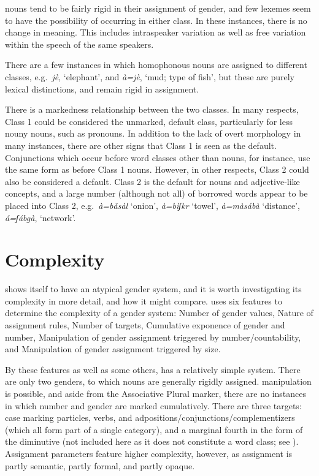 \documentclass[output=collectionpaper,hidelinks]{langscibook}
\theoremstyle{remark}
\begin{document}
 nouns tend to be fairly rigid in their assignment of gender, and few
lexemes seem to have the possibility of occurring in either class. In these
instances, there is no change in meaning. This includes intraspeaker variation
as well as free variation within the speech of the same speakers.

There are a few instances in which homophonous nouns are assigned to different
classes, e.g.\ \emph{jè}, `elephant', and \emph{à=jè}, `mud; type of fish',
but these are purely lexical distinctions, and remain rigid in assignment.

There is a markedness relationship between the two classes. In many respects,
Class 1 could be considered the unmarked, default class, particularly for less
nouny nouns, such as pronouns. In addition to the lack of overt morphology in
many instances, there are other signs that Class 1 is seen as the default.
Conjunctions which occur before word classes other than nouns, for instance, use
the same form as before Class 1 nouns.
However, in other respects, Class 2 could also be considered a default.  Class 2
is the default for nouns and adjective-like concepts, and a large number
(although not all) of borrowed words appear to be placed into Class 2, e.g.\
\emph{à=bǎsàl} `onion', \emph{à=bìʃk\iLowMid{}\hspace*{-0.6mm}r} `towel',
\emph{à=màsábà} `distance', \emph{á=ʃáb\aLowMid{}\hspace*{-.4mm}gà},
`network'.

\section{Complexity}
\label{sec:Complexity}

 shows itself to have an atypical gender system, and it is worth
investigating its complexity in more detail, and how it might compare.
\citet[183]{DiGarbo2014} uses six features to determine the
complexity of a gender system: Number of gender values, Nature of assignment
rules, Number of targets, Cumulative exponence of gender and number,
Manipulation of gender assignment triggered by number/countability, and
Manipulation of gender assignment triggered by size.

By these features as well as some others,  has a relatively
simple system. There are only two genders, to which nouns are generally rigidly
assigned. \ili{No} manipulation is possible, and aside from the Associative Plural
marker, there are no instances in which number and gender are marked
cumulatively. There are three targets: case marking particles, verbs, and
adpositions\slash conjunctions\slash complementizers (which all form part of a single
category), and a marginal fourth in the form of the diminutive (not included
here as it does not constitute a word class; see ). Assignment parameters feature
higher complexity, however, as assignment is partly semantic, partly formal, and
partly opaque.
\end{document}
